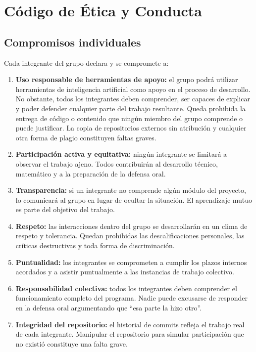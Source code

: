 \documentclass[12pt,a4paper]{article}
\begin{document}
\section{Código de Ética y Conducta}

\subsection{Compromisos individuales}

Cada integrante del grupo declara y se compromete a:

\begin{enumerate}[leftmargin=1.5em, label=\textbf{\arabic*.}, itemsep=4pt]

  \item \textbf{Uso responsable de herramientas de apoyo:} el grupo podrá utilizar herramientas de inteligencia artificial como apoyo en el proceso de desarrollo. No obstante, todos los integrantes deben comprender, ser capaces de explicar y poder defender cualquier parte del trabajo resultante. Queda prohibida la entrega de código o contenido que ningún miembro del grupo comprende o puede justificar. La copia de repositorios externos sin atribución y cualquier otra forma de plagio constituyen faltas graves.

  \item \textbf{Participación activa y equitativa:} ningún integrante se limitará a observar el trabajo ajeno. Todos contribuirán al desarrollo técnico, matemático y a la preparación de la defensa oral.

  \item \textbf{Transparencia:} si un integrante no comprende algún módulo del proyecto, lo comunicará al grupo en lugar de ocultar la situación. El aprendizaje mutuo es parte del objetivo del trabajo.

  \item \textbf{Respeto:} las interacciones dentro del grupo se desarrollarán en un clima de respeto y tolerancia. Quedan prohibidas las descalificaciones personales, las críticas destructivas y toda forma de discriminación.

  \item \textbf{Puntualidad:} los integrantes se comprometen a cumplir los plazos internos acordados y a asistir puntualmente a las instancias de trabajo colectivo.

  \item \textbf{Responsabilidad colectiva:} todos los integrantes deben comprender el funcionamiento completo del programa. Nadie puede excusarse de responder en la defensa oral argumentando que ``esa parte la hizo otro''.

  \item \textbf{Integridad del repositorio:} el historial de commits refleja el trabajo real de cada integrante. Manipular el repositorio para simular participación que no existió constituye una falta grave.

\end{enumerate}
\end{document}
